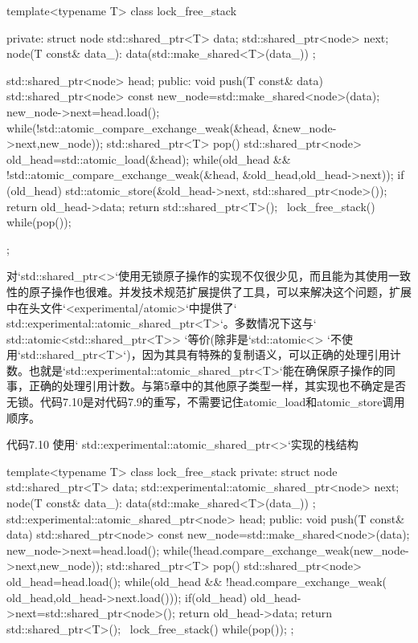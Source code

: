 \begin{cpp}
template<typename T>
class lock_free_stack
{
private:
  struct node
  {
    std::shared_ptr<T> data;
    std::shared_ptr<node> next;
    node(T const& data_):
      data(std::make_shared<T>(data_))
    {}
  };

  std::shared_ptr<node> head;
public:
  void push(T const& data)
  {
    std::shared_ptr<node> const new_node=std::make_shared<node>(data);
    new_node->next=head.load();
    while(!std::atomic_compare_exchange_weak(&head,
        &new_node->next,new_node));
  }
  std::shared_ptr<T> pop()
  {
    std::shared_ptr<node> old_head=std::atomic_load(&head);
    while(old_head && !std::atomic_compare_exchange_weak(&head,
        &old_head,old_head->next));
    if (old_head){
      std::atomic_store(&old_head->next, std::shared_ptr<node>());
      return old_head->data;
    }
    return std::shared_ptr<T>();
  }
  ~lock_free_stack(){
    while(pop());
  }
};
\end{cpp}

对`std::shared\_ptr<>`使用无锁原子操作的实现不仅很少见，而且能为其使用一致性的原子操作也很难。并发技术规范扩展提供了工具，可以来解决这个问题，扩展中在头文件`<experimental/atomic>`中提供了` std::experimental::atomic\_shared\_ptr<T>`。多数情况下这与` std::atomic<std::shared\_ptr<T>> `等价(除非是`std::atomic<> `不使用`std::shared\_ptr<T>`)，因为其具有特殊的复制语义，可以正确的处理引用计数。也就是`std::experimental::atomic\_shared\_ptr<T>`能在确保原子操作的同事，正确的处理引用计数。与第5章中的其他原子类型一样，其实现也不确定是否无锁。代码7.10是对代码7.9的重写，不需要记住atomic\_load和atomic\_store调用顺序。

代码7.10 使用` std::experimental::atomic\_shared\_ptr<>`实现的栈结构

\begin{cpp}
template<typename T>
class lock_free_stack
{
private:
  struct node
  {
    std::shared_ptr<T> data;
    std::experimental::atomic_shared_ptr<node> next;
    node(T const& data_):
      data(std::make_shared<T>(data_))
    {}
  };
  std::experimental::atomic_shared_ptr<node> head;
public:
  void push(T const& data)
  {
    std::shared_ptr<node> const new_node=std::make_shared<node>(data);
    new_node->next=head.load();
    while(!head.compare_exchange_weak(new_node->next,new_node));
  }
  std::shared_ptr<T> pop()
  {
    std::shared_ptr<node> old_head=head.load();
    while(old_head && !head.compare_exchange_weak(
      old_head,old_head->next.load()));
    if(old_head) {
      old_head->next=std::shared_ptr<node>();
      return old_head->data;
    }
    return std::shared_ptr<T>();
  }
  ~lock_free_stack(){
    while(pop());
  }
};
\end{cpp}

